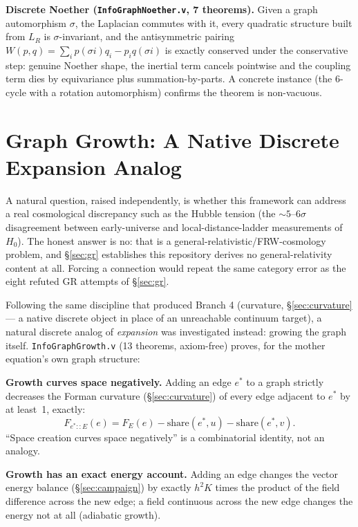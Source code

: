 \documentclass[10pt,twocolumn]{article}
\begin{document}
\textbf{Discrete Noether (\texttt{InfoGraphNoether.v}, 7 theorems).} Given a graph
automorphism $\sigma$, the Laplacian commutes with it, every quadratic structure
built from $L_R$ is $\sigma$-invariant, and the antisymmetric pairing
$W(p,q)=\sum_i p(\sigma i)q_i - p_i q(\sigma i)$ is exactly conserved under the
conservative step: genuine Noether shape, the inertial term cancels pointwise and the
coupling term dies by equivariance plus summation-by-parts. A concrete instance (the
6-cycle with a rotation automorphism) confirms the theorem is non-vacuous.

\section{Graph Growth: A Native Discrete Expansion Analog}
\label{sec:growth}
A natural question, raised independently, is whether this framework can address a
real cosmological discrepancy such as the Hubble tension (the $\sim5$--$6\sigma$
disagreement between early-universe and local-distance-ladder measurements of
$H_0$). The honest answer is no: that is a general-relativistic/FRW-cosmology
problem, and \S\ref{sec:gr} establishes this repository derives no general-relativity
content at all. Forcing a connection would repeat the same category error as the
eight refuted GR attempts of \S\ref{sec:gr}.

Following the same discipline that produced Branch 4 (curvature, \S\ref{sec:curvature}
--- a native discrete object in place of an unreachable continuum target), a natural
discrete analog of \emph{expansion} was investigated instead: growing the graph
itself. \texttt{InfoGraphGrowth.v} (13 theorems, axiom-free) proves, for the mother
equation's own graph structure:

\textbf{Growth curves space negatively.} Adding an edge $e^*$ to a graph strictly
decreases the Forman curvature (\S\ref{sec:curvature}) of every edge adjacent to
$e^*$ by at least~1, exactly:
\begin{equation}
F_{e^*::E}(e) = F_E(e) - \mathrm{share}(e^*,u) - \mathrm{share}(e^*,v).
\label{eq:growthcurve}
\end{equation}
``Space creation curves space negatively'' is a combinatorial identity, not an
analogy.

\textbf{Growth has an exact energy account.} Adding an edge changes the vector energy
balance (\S\ref{sec:campaign}) by exactly $h^2K$ times the product of the field
difference across the new edge; a field continuous across the new edge changes the
energy not at all (adiabatic growth).
\end{document}
